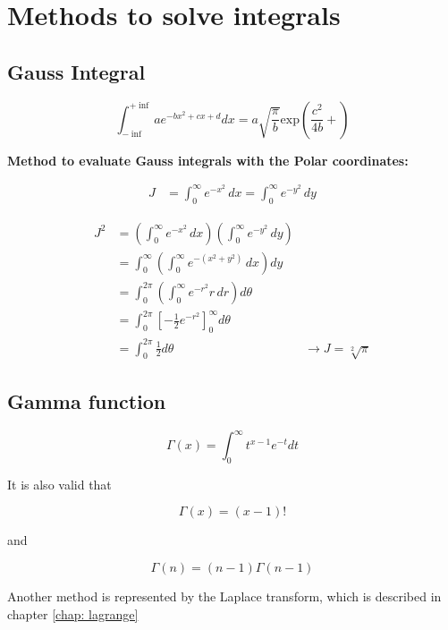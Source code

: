 \section{Methods to solve integrals}

\subsection{Gauss Integral}

\begin{equation}
    \int_{-\inf}^{+\inf}{a e^{-b x^2 + cx + d} dx} = a \sqrt{\frac{\pi}{b}} \text{exp}\left(\frac{c^2}{4b} + \right)
\end{equation}

\textbf{Method to evaluate Gauss integrals with the Polar coordinates:}

\begin{align*}
    J &= \int_0^\infty e^{-x^2} \, dx = \int_0^\infty e^{-y^2} \, dy
\end{align*}

\begin{align*}
    J^2 &= \left(\int_0^\infty e^{-x^2} \, dx\right) \left(\int_0^\infty e^{-y^2} \, dy\right) \\
        &= \int_0^\infty \left(\int_0^\infty e^{-(x^2 + y^2)} \, dx\right) dy \\
        &= \int_0^{2\pi} \left(\int_0^\infty e^{-r^2} r \, dr\right) d\theta \\
        &= \int_0^{2 \pi}{[-\frac{1}{2} e^{-r^2}]_0^\infty d\theta} \\
        &= \int_0^{2 \pi}{\frac{1}{2} d\theta}
        &\rightarrow J = \sqrt[2]{\pi}
\end{align*}

\subsection{Gamma function}

\[
  \Gamma(x) = \int_0^\infty{t^{x-1} e^{-t} dt}  
\]

It is also valid that

$$
\Gamma(x) = (x-1)!
$$

and

$$
\Gamma(n) = (n-1)\Gamma(n-1)
$$

Another method is represented by the Laplace transform, which is described in chapter \ref{chap: lagrange}